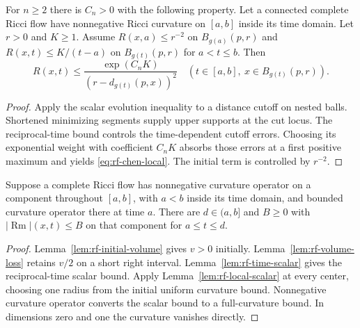 \begin{lemma}\label{lem:rf-local-scalar}
For $n\geq2$ there is $C_n>0$ with the following property.
Let a connected complete Ricci flow have nonnegative Ricci
curvature on $[a,b]$ inside its time domain. Let $r>0$ and $K\geq1$.
Assume $R(x,a)\leq r^{-2}$ on $B_{g(a)}(p,r)$ and
$R(x,t)\leq K/(t-a)$ on $B_{g(t)}(p,r)$ for $a<t\leq b$.
Then
\begin{equation}\label{eq:rf-chen-local}
 R(x,t)\leq
 \frac{\exp(C_nK)}{(r-d_{g(t)}(p,x))^2}
 \quad(t\in[a,b],\ x\in B_{g(t)}(p,r)).
\end{equation}
\end{lemma}
\begin{proof}
Apply the scalar evolution inequality to a distance cutoff on nested
balls. Shortened minimizing segments supply upper supports at the
cut locus. The reciprocal-time bound controls the time-dependent
cutoff errors. Choosing its exponential weight with coefficient
$C_nK$ absorbs those errors at a first positive maximum and yields
\eqref{eq:rf-chen-local}. The initial term is controlled by $r^{-2}$.
\end{proof}

\begin{lemma}\label{lem:rf-right-bound}
Suppose a complete Ricci flow has nonnegative curvature operator
on a component throughout $[a,b]$, with $a<b$ inside its time domain,
and bounded curvature operator there at time $a$. There are
$d\in(a,b]$ and $B\geq0$ with
$|\operatorname{Rm}|(x,t)\leq B$ on that component for $a\leq t\leq d$.
\end{lemma}
\begin{proof}
Lemma~\ref{lem:rf-initial-volume} gives $v>0$ initially.
Lemma~\ref{lem:rf-volume-loss} retains $v/2$ on a short right interval.
Lemma~\ref{lem:rf-time-scalar} gives the reciprocal-time scalar bound.
Apply Lemma~\ref{lem:rf-local-scalar} at every center, choosing one
radius from the initial uniform curvature bound. Nonnegative
curvature operator converts the scalar bound to a full-curvature bound.
In dimensions zero and one the curvature vanishes directly.
\end{proof}


